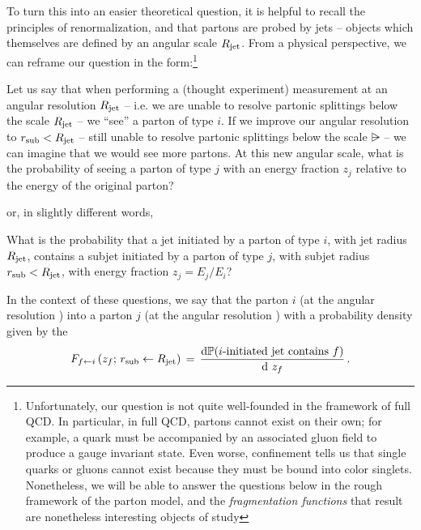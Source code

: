 To turn this into an easier theoretical question, it is helpful to recall the principles of renormalization, and that partons are probed by jets -- objects which themselves are defined by an angular scale \(R_\text{jet}\).
%
From a physical perspective, we can reframe our question in the form:\footnote{
    Unfortunately, our question is not quite well-founded in the framework of full QCD.
    In particular, in full QCD, partons cannot exist on their own;
    for example, a quark must be accompanied by an associated gluon field to produce a gauge invariant state.
    Even worse, confinement tells us that single quarks or gluons cannot exist because they must be bound into color singlets.
    Nonetheless, we will be able to answer the questions below in the rough framework of the parton model, and the \textit{fragmentation functions} that result are nonetheless interesting objects of study
}
\begin{question*}{}{}
    Let us say that when performing a (thought experiment) measurement at an angular resolution \(R_\text{jet}\) -- i.e. we are unable to resolve partonic splittings below the scale \(R_\text{jet}\) -- we ``see'' a parton of type \(i\).
    If we improve our angular resolution to \(r_\text{sub} < R_\text{jet}\) -- still unable to resolve partonic splittings below the scale \(\rsub\) -- we can imagine that we would see more partons.
    At this new angular scale, what is the probability of seeing a parton of type \(j\) with an energy fraction \(z_j\) relative to the energy of the original parton?
\end{question*}
%
\noindent
or, in slightly different words,
%
\begin{question*}{}{}
    What is the probability that a jet initiated by a parton of type \(i\), with jet radius \(R_\text{jet}\), contains a subjet initiated by a parton of type \(j\), with subjet radius \(r_\text{sub} < R_\text{jet}\), with energy fraction \(z_j = E_j / E_i\)?
\end{question*}

In the context of these questions, we say that the parton \(i\) (at the angular resolution \Rjet)  into a parton \(j\) (at the angular resolution \rsub) with a probability density given by the 
\begin{align}
    \label{eq:fragmentation_function}
    F_{f \leftarrow i}
    \le(z_f; \, \rsub \leftarrow \Rjet\ri)
    \,
    =
    \,
    \frac{\dd\mathbb{P}(i\text{-initiated jet contains }f)}{\dd  \,\,z_f}
    \,.
\end{align}




